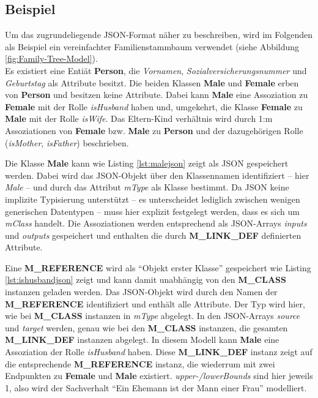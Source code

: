 \subsection{Beispiel}
Um das zugrundeliegende JSON-Format n\"aher zu beschreiben, wird im Folgenden als Beispiel ein vereinfachter Familienstammbaum verwendet (siehe Abbildung \ref{fig:Family-Tree-Model}).\\ 
Es existiert eine Entiät \textbf{Person}, die \textit{Vornamen}, \textit{Sozialversicherungsnummer} und \textit{Geburtstag} als Attribute besitzt. Die beiden Klassen \textbf{Male} und \textbf{Female} erben von \textbf{Person} und besitzen keine Attribute. Dabei kann \textbf{Male} eine Assoziation zu \textbf{Female} mit der Rolle \textit{isHusband} haben und, umgekehrt, die Klasse \textbf{Female} zu \textbf{Male} mit der Rolle \textit{isWife}. Das Eltern-Kind verh\"altnis wird durch 1:m Assoziationen von \textbf{Female} bzw. \textbf{Male} zu \textbf{Person} und der dazugeh\"origen Rolle (\textit{isMother}, \textit{isFather}) beschrieben.



Die Klasse \textbf{Male} kann wie Listing \ref{lst:malejson} zeigt als JSON gespeichert werden. Dabei wird das JSON-Objekt \"uber den Klassennamen identifiziert -- hier \textit{Male} -- und durch das Attribut \textit{mType} als Klasse bestimmt. Da JSON keine implizite Typisierung unterstützt -- es unterscheidet lediglich zwischen wenigen generischen Datentypen -- muss hier explizit festgelegt werden, dass es sich um \textit{mClass} handelt. Die Assoziationen werden entsprechend als JSON-Arrays \textit{inputs} und \textit{outputs} gespeichert und enthalten die durch \textbf{M\_LINK\_DEF} definierten Attribute.



Eine \textbf{M\_REFERENCE} wird als "`Objekt erster Klasse"' gespeichert wie Listing \ref{lst:ishusbandjson} zeigt und kann damit unabhängig von den \textbf{M\_CLASS} instanzen geladen werden. Das JSON-Objekt wird durch den Namen der \textbf{M\_REFERENCE} identifiziert und enth\"alt alle Attribute. Der Typ wird hier, wie bei \textbf{M\_CLASS} instanzen in \textit{mType} abgelegt. In den JSON-Arrays \textit{source} und \textit{target} werden, genau wie bei den \textbf{M\_CLASS} instanzen, die gesamten \textbf{M\_LINK\_DEF} instanzen abgelegt. In diesem Modell kann \textbf{Male} eine Assoziation der Rolle \textit{isHusband} haben. Diese \textbf{M\_LINK\_DEF} instanz zeigt auf die entsprechende \textbf{M\_REFERENCE} instanz, die wiederrum mit zwei Endpunkten zu \textbf{Female} und \textbf{Male} existiert. \textit{upper-/lowerBounds} sind hier jeweils 1, also wird der Sachverhalt "`Ein Ehemann ist der Mann einer Frau"' modelliert.

